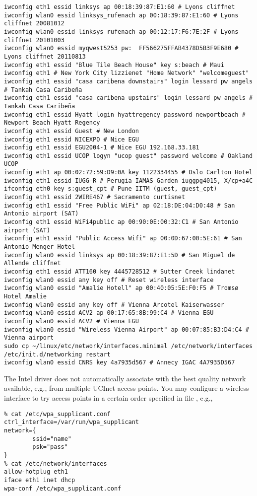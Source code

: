 \documentclass[12pt,twoside]{article}
\begin{document}
\begin{verbatim}
iwconfig eth1 essid linksys ap 00:18:39:87:E1:60 # Lyons cliffnet
iwconfig wlan0 essid linksys_rufenach ap 00:18:39:87:E1:60 # Lyons cliffnet 20081012
iwconfig wlan0 essid linksys_rufenach ap 00:12:17:F6:7E:2F # Lyons cliffnet 20101003
iwconfig wlan0 essid myqwest5253 pw:  FF566275FFAB4378D5B3F9E680 # Lyons cliffnet 20110813
iwconfig eth1 essid "Blue Tile Beach House" key s:beach # Maui
iwconfig eth1 # New York City lizzienet "Home Network" "welcomeguest"
iwconfig eth1 essid "casa caribena downstairs" login lessard pw angels # Tankah Casa Caribeña
iwconfig eth1 essid "casa caribena upstairs" login lessard pw angels # Tankah Casa Caribeña
iwconfig eth1 essid Hyatt login hyattregency password newportbeach # Newport Beach Hyatt Regency
iwconfig eth1 essid Guest # New London
iwconfig eth1 essid NICEXPO # Nice EGU
iwconfig eth1 essid EGU2004-1 # Nice EGU 192.168.33.181
iwconfig eth1 essid UCOP logyn "ucop guest" password welcome # Oakland UCOP
iwconfig eth1 ap 00:02:72:59:D9:0A key 1122334455 # Oslo Carlton Hotel
iwconfig eth1 essid IUGG-R # Perugia IAMAS Garden iuggpg4015, X/cp+a4C
ifconfig eth0 key s:guest_cpt # Pune IITM (guest, guest_cpt)
iwconfig eth1 essid 2WIRE467 # Sacramento curtisnet
iwconfig eth1 essid "Free Public WiFi" ap 02:18:DE:04:D0:48 # San Antonio airport (SAT)
iwconfig eth1 essid WiFi4public ap 00:90:0E:00:32:C1 # San Antonio airport (SAT)
iwconfig eth1 essid "Public Access Wifi" ap 00:0D:67:00:5E:61 # San Antonio Menger Hotel
iwconfig wlan0 essid linksys ap 00:18:39:87:E1:5D # San Miguel de Allende cliffnet
iwconfig eth1 essid ATT160 key 4445728512 # Sutter Creek lindanet
iwconfig wlan0 essid any key off # Reset wireless interface
iwconfig wlan0 essid "Amalie Hotell" ap 00:40:05:5E:F0:F5 # Tromsø Hotel Amalie
iwconfig wlan0 essid any key off # Vienna Arcotel Kaiserwasser
iwconfig wlan0 essid ACV2 ap 00:17:65:8B:99:C4 # Vienna EGU
iwconfig wlan0 essid ACV2 # Vienna EGU
iwconfig wlan0 essid "Wireless Vienna Airport" ap 00:07:85:B3:D4:C4 # Vienna airport
sudo cp ~/linux/etc/network/interfaces.minimal /etc/network/interfaces
/etc/init.d/networking restart
iwconfig wlan0 essid CNRS key 4a7935d567 # Annecy IGAC 4A7935D567
\end{verbatim}
The Intel  driver does not automatically associate
with the best quality network available, e.g., from multiple UCInet
access points. 
You may configure a wireless interface to try access points in a
certain order specified in file ,
e.g., 
\begin{verbatim}
% cat /etc/wpa_supplicant.conf
ctrl_interface=/var/run/wpa_supplicant
network={
        ssid="name"
        psk="pass"
}
% cat /etc/network/interfaces 
allow-hotplug eth1
iface eth1 inet dhcp
wpa-conf /etc/wpa_supplicant.conf
\end{verbatim}
\end{document}
